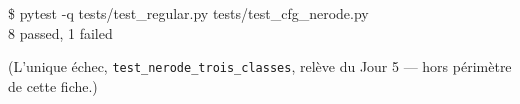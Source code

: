 \documentclass[11pt,a4paper]{scrartcl}
\begin{document}
\begin{exemple}
\ttfamily \$ pytest -q tests/test\_regular.py tests/test\_cfg\_nerode.py\\
8 passed, 1 failed
\end{exemple}
\noindent (L'unique échec, \texttt{test\_nerode\_trois\_classes}, relève du Jour 5 —
hors périmètre de cette fiche.)
\end{document}
